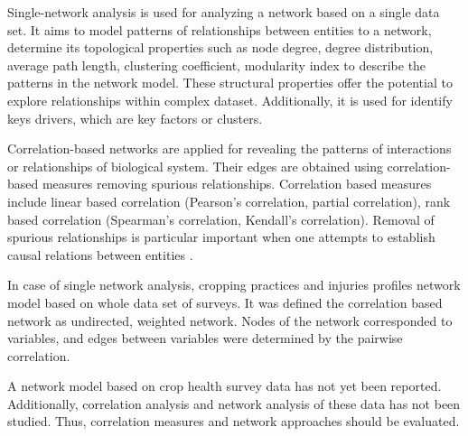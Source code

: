 Single-network analysis is used for analyzing a network based on a single data set. It aims to model patterns of relationships between entities to a network, determine its topological properties such as node degree, degree distribution, average path length, clustering coefficient, modularity index  to describe the patterns in the network model. These structural properties offer the potential to explore relationships within complex dataset. Additionally, it is used for identify keys drivers, which are key factors or clusters.

Correlation-based networks are applied for revealing the patterns of interactions or relationships of biological system. Their edges are obtained using correlation-based measures removing spurious relationships. Correlation based measures include linear based correlation (Pearson's correlation, partial correlation), rank based correlation (Spearman's correlation, Kendall's correlation). Removal of spurious relationships is particular important when one attempts to establish causal relations between entities .




In case of single network analysis, cropping practices and injuries profiles network model based on whole data set of surveys. It was defined the correlation based network as undirected, weighted network. Nodes of the network corresponded to variables, and edges between variables were determined by the pairwise correlation.

A network model based on crop health survey data has not yet been reported. Additionally, correlation analysis and network analysis of these data has not been studied. Thus, correlation measures and network approaches should be evaluated.

